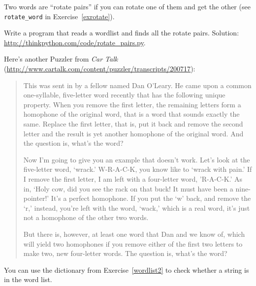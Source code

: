 \documentclass[10pt]{book}
\begin{document}
\begin{CJK}{UTF8}{gbsn}
\begin{exercise}
\end{exercise}


\begin{exercise}
\label{exrotatepairs}

Two words are ``rotate pairs'' if you can rotate one of them
and get the other (see \verb"rotate_word" in Exercise~\ref{exrotate}).

Write a program that reads a wordlist and finds all the rotate
pairs.  Solution: \url{http://thinkpython.com/code/rotate_pairs.py}.

\end{exercise}


\begin{exercise}

Here's another Puzzler from {\em Car
Talk} (\url{http://www.cartalk.com/content/puzzler/transcripts/200717}):

\begin{quote}
This was sent in by a fellow named Dan O'Leary. He came upon a common
one-syllable, five-letter word recently that has the following unique
property. When you remove the first letter, the remaining letters form
a homophone of the original word, that is a word that sounds exactly
the same. Replace the first letter, that is, put it back and remove
the second letter and the result is yet another homophone of the
original word. And the question is, what's the word?

Now I'm going to give you an example that doesn't work. Let's look at
the five-letter word, `wrack.' W-R-A-C-K, you know like to `wrack with
pain.' If I remove the first letter, I am left with a four-letter
word, 'R-A-C-K.' As in, `Holy cow, did you see the rack on that buck!
It must have been a nine-pointer!' It's a perfect homophone. If you
put the `w' back, and remove the `r,' instead, you're left with the
word, `wack,' which is a real word, it's just not a homophone of the
other two words.

But there is, however, at least one word that Dan and we know of,
which will yield two homophones if you remove either of the first two
letters to make two, new four-letter words. The question is, what's
the word?
\end{quote}

You can use the dictionary from Exercise~\ref{wordlist2} to check
whether a string is in the word list.


\end{exercise}
\end{CJK}
\end{document}
